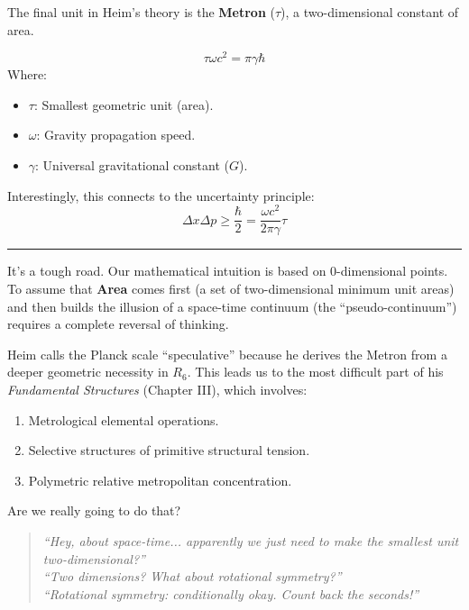 \documentclass[11pt,a4paper,oneside]{article}
\newenvironment{fancyquote}
    {\begin{quote}\itshape\color{theoryblue!80!black}\guillemotleft\;}
    {\;\guillemotright\end{quote}}
\newcommand{\hr}{\par\vspace{2em}\noindent\rule{\linewidth}{0.4pt}\par\vspace{2em}}
\begin{document}
The final unit in Heim’s theory is the \textbf{Metron} ($\tau$), a two-dimensional constant of area.

\begin{equation}
    \tau \omega c^2 = \pi \gamma \hbar \tag{Metron Formula}
\end{equation}
Where:
\begin{itemize}
    \item $\tau$: Smallest geometric unit (area).
    \item $\omega$: Gravity propagation speed.
    \item $\gamma$: Universal gravitational constant ($G$).
\end{itemize}

Interestingly, this connects to the uncertainty principle:
\begin{equation}
    \Delta x \Delta p \geq \frac{\hbar}{2} = \frac{\omega c^2}{2 \pi \gamma} \tau
\end{equation}

\hr

\begin{reflectionbox}[title={Notes and Reflections: Inverting Intuition}]
It’s a tough road. Our mathematical intuition is based on 0-dimensional points. To assume that \textbf{Area} comes first (a set of two-dimensional minimum unit areas) and then builds the illusion of a space-time continuum (the ``pseudo-continuum'') requires a complete reversal of thinking.

Heim calls the Planck scale ``speculative'' because he derives the Metron from a deeper geometric necessity in $R_6$. This leads us to the most difficult part of his \textit{Fundamental Structures} (Chapter III), which involves:
\begin{enumerate}
    \item Metrological elemental operations.
    \item Selective structures of primitive structural tension.
    \item Polymetric relative metropolitan concentration.
\end{enumerate}

Are we really going to do that?

\begin{fancyquote}
    ``Hey, about space-time... apparently we just need to make the smallest unit two-dimensional?''\\
    ``Two dimensions? What about rotational symmetry?''\\
    ``Rotational symmetry: conditionally okay. Count back the seconds!''
\end{fancyquote}
\end{reflectionbox}
\end{document}

